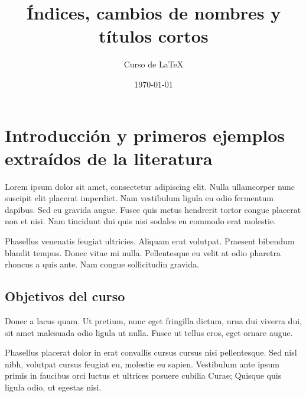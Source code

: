 \documentclass[12pt,a4paper]{report}
\title{Índices, cambios de nombres y títulos cortos}
\author{Curso de \LaTeX}
\date{\today}
\begin{document}



\maketitle 


{
\setlength{\parskip}{0pt}
\tableofcontents
}


{
\setlength{\parskip}{0pt}
\listoffigures
}




{
\setlength{\parskip}{0pt}
\listoftables
}





\chapter[Introducción]{Introducción y primeros ejemplos extraídos de la literatura}
\label{tema.introduccion}



Lorem ipsum dolor sit amet, consectetur adipiscing elit. Nulla ullamcorper nunc suscipit elit placerat imperdiet. Nam vestibulum ligula eu odio fermentum dapibus. Sed eu gravida augue. Fusce quis metus hendrerit tortor congue placerat non et nisi. Nam tincidunt dui quis nisi sodales eu commodo erat molestie. 

Phasellus venenatis feugiat ultricies. Aliquam erat volutpat. Praesent bibendum blandit tempus. Donec vitae mi nulla. Pellentesque eu velit at odio pharetra rhoncus a quis ante. Nam congue sollicitudin gravida. 





\section{Objetivos del curso}
\label{seccion.objetivos}



Donec a lacus quam. Ut pretium, nunc eget fringilla dictum, urna dui viverra dui, sit amet malesuada odio ligula ut nulla. Fusce ut tellus eros, eget ornare augue.

Phasellus placerat dolor in erat convallis cursus cursus nisi pellentesque. Sed nisl nibh, volutpat cursus feugiat eu, molestie eu sapien. Vestibulum ante ipsum primis in faucibus orci luctus et ultrices posuere cubilia Curae; Quisque quis ligula odio, ut egestas nisi. 
\end{document}
